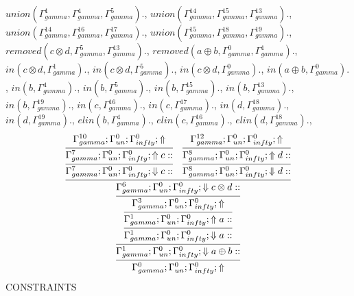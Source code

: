 \documentclass[a4paper, 11pt]{article}
\begin{document}
$union(\Gamma_{gamma}^{1}, \Gamma_{gamma}^{4}, \Gamma_{gamma}^{5}).$, $union(\Gamma_{gamma}^{14}, \Gamma_{gamma}^{15}, \Gamma_{gamma}^{13}).$, $union(\Gamma_{gamma}^{14}, \Gamma_{gamma}^{16}, \Gamma_{gamma}^{17}).$, $union(\Gamma_{gamma}^{15}, \Gamma_{gamma}^{18}, \Gamma_{gamma}^{19}).$, $removed(c \otimes d, \Gamma_{gamma}^{5}, \Gamma_{gamma}^{13}).$, $removed(a \oplus b, \Gamma_{gamma}^{0}, \Gamma_{gamma}^{1}).$, $in(c \otimes d, \Gamma_{gamma}^{1}).$, $in(c \otimes d, \Gamma_{gamma}^{5}).$, $in(c \otimes d, \Gamma_{gamma}^{0}).$, $in(a \oplus b, \Gamma_{gamma}^{0}).$, $in(b, \Gamma_{gamma}^{4}).$, $in(b, \Gamma_{gamma}^{5}).$, $in(b, \Gamma_{gamma}^{15}).$, $in(b, \Gamma_{gamma}^{13}).$, $in(b, \Gamma_{gamma}^{19}).$, $in(c, \Gamma_{gamma}^{16}).$, $in(c, \Gamma_{gamma}^{17}).$, $in(d, \Gamma_{gamma}^{18}).$, $in(d, \Gamma_{gamma}^{19}).$, $elin(b, \Gamma_{gamma}^{4}).$, $elin(c, \Gamma_{gamma}^{16}).$, $elin(d, \Gamma_{gamma}^{18}).$, 
\[
\infer{\Gamma_{ gamma}^{0} ; \Gamma_{un}^{0} ; \Gamma_{ infty}^{0} ;  \Uparrow }
{\infer{\Gamma_{ gamma}^{1} ; \Gamma_{un}^{0} ; \Gamma_{ infty}^{0} ;  \Downarrow a \oplus b :: }
{\infer{\Gamma_{ gamma}^{1} ; \Gamma_{un}^{0} ; \Gamma_{ infty}^{0} ;  \Downarrow a :: }
{\infer{\Gamma_{ gamma}^{1} ; \Gamma_{un}^{0} ; \Gamma_{ infty}^{0} ;  \Uparrow a :: }
{\infer{\Gamma_{ gamma}^{3} ; \Gamma_{un}^{0} ; \Gamma_{ infty}^{0} ;  \Uparrow }
{\infer{\Gamma_{ gamma}^{6} ; \Gamma_{un}^{0} ; \Gamma_{ infty}^{0} ;  \Downarrow c \otimes d :: }
{\infer{\Gamma_{ gamma}^{7} ; \Gamma_{un}^{0} ; \Gamma_{ infty}^{0} ;  \Downarrow c :: }
{\infer{\Gamma_{ gamma}^{7} ; \Gamma_{un}^{0} ; \Gamma_{ infty}^{0} ;  \Uparrow c :: }
{\Gamma_{ gamma}^{10} ; \Gamma_{un}^{0} ; \Gamma_{ infty}^{0} ;  \Uparrow }}
&
\infer{\Gamma_{ gamma}^{8} ; \Gamma_{un}^{0} ; \Gamma_{ infty}^{0} ;  \Downarrow d :: }
{\infer{\Gamma_{ gamma}^{8} ; \Gamma_{un}^{0} ; \Gamma_{ infty}^{0} ;  \Uparrow d :: }
{\Gamma_{ gamma}^{12} ; \Gamma_{un}^{0} ; \Gamma_{ infty}^{0} ;  \Uparrow }}}}}}}}
\]
CONSTRAINTS
\end{document}
